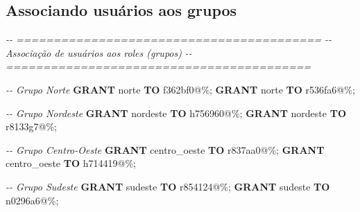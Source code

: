 \documentclass[
]{book}
\makeatletter
\newenvironment{Shaded}{\begin{snugshade}}{\end{snugshade}}
\newcommand{\CommentTok}[1]{\textcolor[rgb]{0.56,0.35,0.01}{\textit{#1}}}
\newcommand{\KeywordTok}[1]{\textcolor[rgb]{0.13,0.29,0.53}{\textbf{#1}}}
\newcommand{\NormalTok}[1]{#1}
\newcommand{\StringTok}[1]{\textcolor[rgb]{0.31,0.60,0.02}{#1}}
\newcommand*\pandocbounded[1]{%
  \sbox\pandoc@box{#1}%
  \Gscale@div\@tempa{\textheight}{\dimexpr\ht\pandoc@box+\dp\pandoc@box\relax}%
  \Gscale@div\@tempb{\linewidth}{\wd\pandoc@box}%
  \ifdim\@tempb\p@<\@tempa\p@\let\@tempa\@tempb\fi%
  \ifdim\@tempa\p@<\p@\scalebox{\@tempa}{\usebox\pandoc@box}%
  \else\usebox{\pandoc@box}%
  \fi%
}
\makeatother
\begin{document}
\pandocbounded{}

\subsection{Associando usuários aos grupos}\label{associando-usuuxe1rios-aos-grupos}

\begin{Shaded}
\begin{Highlighting}[]
\CommentTok{{-}{-} =========================================}
\CommentTok{{-}{-} Associação de usuários aos roles (grupos)}
\CommentTok{{-}{-} =========================================}

\CommentTok{{-}{-} Grupo Norte}
\KeywordTok{GRANT} \StringTok{\textquotesingle{}norte\textquotesingle{}} \KeywordTok{TO} \StringTok{\textquotesingle{}f362bf0\textquotesingle{}}\NormalTok{@}\StringTok{\textquotesingle{}\%\textquotesingle{}}\NormalTok{;}
\KeywordTok{GRANT} \StringTok{\textquotesingle{}norte\textquotesingle{}} \KeywordTok{TO} \StringTok{\textquotesingle{}r536fa6\textquotesingle{}}\NormalTok{@}\StringTok{\textquotesingle{}\%\textquotesingle{}}\NormalTok{;}

\CommentTok{{-}{-} Grupo Nordeste}
\KeywordTok{GRANT} \StringTok{\textquotesingle{}nordeste\textquotesingle{}} \KeywordTok{TO} \StringTok{\textquotesingle{}h756960\textquotesingle{}}\NormalTok{@}\StringTok{\textquotesingle{}\%\textquotesingle{}}\NormalTok{;}
\KeywordTok{GRANT} \StringTok{\textquotesingle{}nordeste\textquotesingle{}} \KeywordTok{TO} \StringTok{\textquotesingle{}r8133g7\textquotesingle{}}\NormalTok{@}\StringTok{\textquotesingle{}\%\textquotesingle{}}\NormalTok{;}

\CommentTok{{-}{-} Grupo Centro{-}Oeste}
\KeywordTok{GRANT} \StringTok{\textquotesingle{}centro\_oeste\textquotesingle{}} \KeywordTok{TO} \StringTok{\textquotesingle{}r837aa0\textquotesingle{}}\NormalTok{@}\StringTok{\textquotesingle{}\%\textquotesingle{}}\NormalTok{;}
\KeywordTok{GRANT} \StringTok{\textquotesingle{}centro\_oeste\textquotesingle{}} \KeywordTok{TO} \StringTok{\textquotesingle{}h714419\textquotesingle{}}\NormalTok{@}\StringTok{\textquotesingle{}\%\textquotesingle{}}\NormalTok{;}

\CommentTok{{-}{-} Grupo Sudeste}
\KeywordTok{GRANT} \StringTok{\textquotesingle{}sudeste\textquotesingle{}} \KeywordTok{TO} \StringTok{\textquotesingle{}r854124\textquotesingle{}}\NormalTok{@}\StringTok{\textquotesingle{}\%\textquotesingle{}}\NormalTok{;}
\KeywordTok{GRANT} \StringTok{\textquotesingle{}sudeste\textquotesingle{}} \KeywordTok{TO} \StringTok{\textquotesingle{}n0296a6\textquotesingle{}}\NormalTok{@}\StringTok{\textquotesingle{}\%\textquotesingle{}}\NormalTok{;}


\end{Highlighting}
\end{Shaded}
\end{document}
